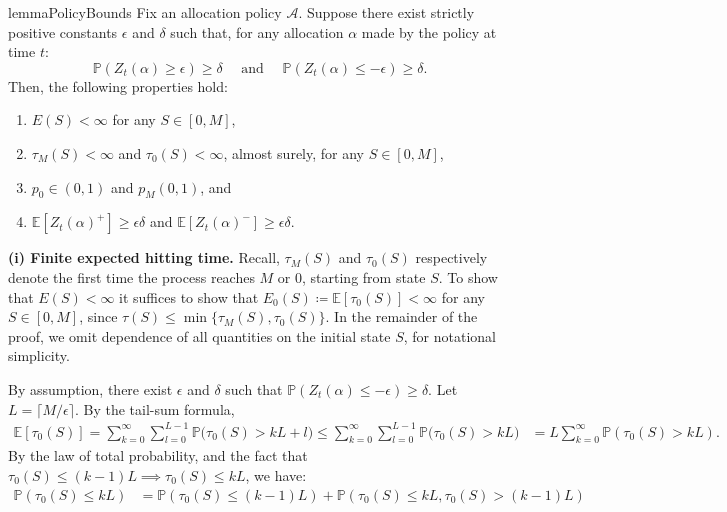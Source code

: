 \documentclass[mnsc,nonblindrev]{informs3}
\newcommand{\E}{\mathbb{E}}
\newcommand{\pr}{\mathbb{P}}
\renewcommand{\Pr}{\pr}
\newcommand{\Exp}[1]{\mathbb{E} \left[ #1 \right]} %
\renewenvironment{proof}[1][Proof]{%
  \par\noindent{\itshape #1.} \ignorespaces
}{%
  \hfill\Halmos\par
}
\begin{document}
\begin{APPENDICES}
\begin{restatable}{lemma}{PolicyBounds}
    \label{lem:policy_constants}
    Fix an allocation policy $\mathcal{A}$.  Suppose there exist strictly positive constants $\epsilon$ and $\delta$ such that, for any allocation $\alpha$ made by the policy at time $t$:
    \[
    \Pr(Z_t(\alpha) \geq \epsilon) \geq \delta \quad \text{ and } \quad \Pr(Z_t(\alpha) \leq - \epsilon) \geq \delta.
    \]
    Then, the following properties hold:
    \begin{enumerate}[label=(\roman*)]
    \item  $E(S) < \infty$ for any $S \in [0,M]$,
    \item $\tau_M(S) < \infty$ and $\tau_0(S) < \infty$, almost surely, for any $S \in [0,M]$,
    \item $p_0 \in (0,1)$ and $p_M (0,1)$, and
    \item $\Exp{Z_t(\alpha)^+} \geq \epsilon \delta$ and $\Exp{Z_t(\alpha)^-} \geq \epsilon \delta$.
    \end{enumerate}
\end{restatable}
\begin{proof}
\noindent\textbf{(i) Finite expected hitting time.} Recall, $\tau_M(S)$ and $\tau_0(S)$ respectively denote the first time the process reaches $M$ or $0$, starting from state $S$. To show that $E(S) < \infty$ it suffices to show that $E_0(S) \coloneqq \Exp{\tau_0(S)} < \infty$ for any $S \in [0,M]$, since $\tau(S) \leq \min\{\tau_M(S), \tau_0(S)\}$. In the remainder of the proof, we omit dependence of all quantities on the initial state $S$, for notational simplicity.

By assumption, there exist $\epsilon$ and $\delta$ such that $\Pr(Z_t(\alpha) \leq -\epsilon) \geq \delta$.  Let $L=\lceil M/\epsilon\rceil$.
By the tail-sum formula,
\begin{align*}
\E[\tau_0(S)] = \sum_{k = 0}^\infty \sum_{l=0}^{L-1} \Pr\big(\tau_0(S)> kL + l\big) \leq \sum_{k = 0}^\infty \sum_{l=0}^{L-1} \Pr\big(\tau_0(S)> kL\big) &= L\sum_{k=0}^{\infty}\mathbb{P}\left(\tau_0(S) > kL\right).
\end{align*}
By the law of total probability, and the fact that $\tau_0(S) \leq (k-1)L \implies \tau_0(S) \leq kL$, we have:
\begin{align}\label{eq:expect-tau0}
\mathbb{P}\left(\tau_0(S) \leq kL\right) &= \mathbb{P}\left(\tau_0(S) \leq (k-1)L\right) + \mathbb{P}\left(\tau_0(S) \leq kL , \tau_0(S) > (k-1)L\right)
\end{align}


\end{proof}
\end{APPENDICES}
\end{document}
